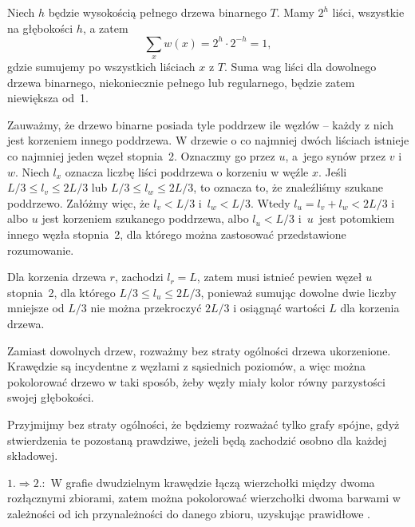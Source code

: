 Niech $h$ będzie wysokością pełnego drzewa binarnego $T$. Mamy $2^h$ liści, wszystkie na głębokości $h$, a zatem
\[
	\sum_{x}w(x) = 2^h\cdot2^{-h} = 1,
\]
gdzie sumujemy po wszystkich liściach $x$ z $T$. Suma wag liści dla dowolnego drzewa binarnego, niekoniecznie pełnego lub regularnego, będzie zatem niewiększa od~1.

\exercise{} %
\bigskip

\noindent Zauważmy, że drzewo binarne posiada tyle poddrzew ile węzłów -- każdy z nich jest korzeniem innego poddrzewa. W drzewie o co najmniej dwóch liściach istnieje co najmniej jeden węzeł stopnia~2. Oznaczmy go przez $u$, a~jego synów przez $v$ i $w$.  Niech $l_x$ oznacza liczbę liści poddrzewa o korzeniu w węźle $x$. Jeśli $L/3\le l_v\le 2L/3$ lub $L/3\le l_w\le 2L/3$, to oznacza to, że znaleźliśmy szukane poddrzewo. Załóżmy więc, że $l_v<L/3$ i~$l_w<L/3$. Wtedy $l_u=l_v+l_w<2L/3$ i albo $u$ jest korzeniem szukanego poddrzewa, albo $l_u<L/3$ i~$u$~jest potomkiem innego węzła stopnia~2, dla którego można zastosować przedstawione rozumowanie.

Dla korzenia drzewa $r$, zachodzi $l_r=L$, zatem musi istnieć pewien węzeł $u$ stopnia~2, dla którego $L/3\le l_u\le 2L/3$, ponieważ sumując dowolne dwie liczby mniejsze od $L/3$ nie można przekroczyć $2L/3$ i osiągnąć wartości $L$ dla korzenia drzewa.

\problems

\subexercise{} %
Zamiast dowolnych drzew, rozważmy bez straty ogólności drzewa ukorzenione. Krawędzie są incydentne z węzłami z sąsiednich poziomów, a więc można pokolorować drzewo w taki sposób, żeby węzły miały kolor równy parzystości swojej głębokości.

\subexercise{} %
Przyjmijmy bez straty ogólności, że będziemy rozważać tylko grafy spójne, gdyż stwierdzenia te pozostaną prawdziwe, jeżeli będą zachodzić osobno dla każdej składowej.
\bigskip

$1.\Rightarrow 2.\!\!:$ W grafie dwudzielnym krawędzie łączą wierzchołki między dwoma rozłącznymi zbiorami, zatem można pokolorować wierzchołki dwoma barwami w zależności od ich przynależności do danego zbioru, uzyskując prawidłowe .
\bigskip

